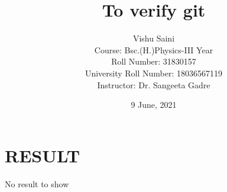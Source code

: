 \documentclass[11pt,a4paper]{article}
\begin{document}



\title{\textbf{To verify git}}
\author{Vishu Saini\\
	Course:  Bsc.(H.)Physics-III Year\\
	Roll Number:  31830157\\			
	University Roll Number: 18036567119\\
	Instructor: Dr. Sangeeta Gadre}
\date{9 June, 2021}
\maketitle
%



\thispagestyle{fancy}






\section*{RESULT}
\begin{enumerate}
No result to show 
\end{enumerate}
\end{document}
